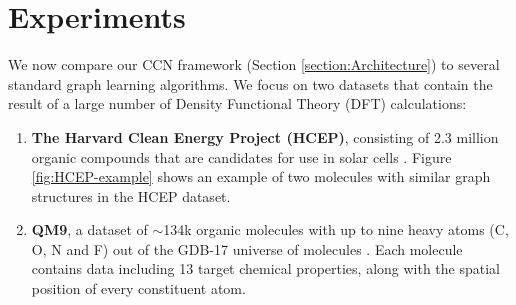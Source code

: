 \documentclass[sigchi]{acmart}
\theoremstyle{definition}
\theoremstyle{theorem}
\theoremstyle{corollary}
\theoremstyle{lemma}
\theoremstyle{remark}
\theoremstyle{prop}
\begin{document}
\section{Experiments}
\label{section:experiments}

We now compare our CCN framework (Section \ref{section:Architecture}) to several standard graph learning algorithms. We focus on two datasets that contain the result of a large number of Density Functional Theory (DFT) calculations:
\begin{enumerate}
\item \textbf{The Harvard Clean Energy Project (HCEP)}, consisting of 2.3 million organic compounds that are candidates for use in solar cells \citep{HCEP}. Figure \ref{fig:HCEP-example} shows an example of two molecules with similar graph structures in the HCEP dataset.
\item \textbf{QM9}, a dataset of $\sim$134k organic molecules with up to nine heavy atoms (C, O, N and F) \citep{QM9} out of the GDB-17 universe of molecules \citep{Ruddigkeit2012}. Each molecule contains data including 13 target chemical properties, along with the spatial position of every constituent atom.
\end{enumerate}
\end{document}
